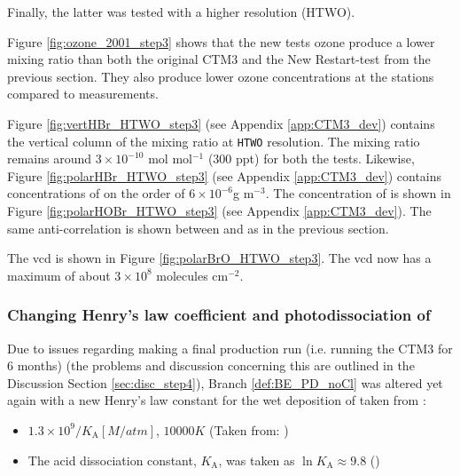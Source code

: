 Finally, the latter was tested with a higher resolution (HTWO). 

\medskip

Figure \ref{fig:ozone_2001_step3} shows that the new tests ozone produce a lower mixing ratio than both the original CTM3 and the New Restart-test from the previous section. They also produce lower ozone concentrations at the stations compared to measurements. 





\medskip

Figure \ref{fig:vertHBr_HTWO_step3} (see Appendix \ref{app:CTM3_dev}) contains the vertical column of the  mixing ratio at \texttt{HTWO} resolution. The mixing ratio remains around $3\times10^{-10}$ mol mol$^{-1}$ (300 ppt) for both the tests. Likewise, Figure \ref{fig:polarHBr_HTWO_step3} (see Appendix \ref{app:CTM3_dev}) contains concentrations of  on the order of $6\times10^{-6} $g m$^{-3}$. The concentration of  is shown in Figure \ref{fig:polarHOBr_HTWO_step3} (see Appendix \ref{app:CTM3_dev}). The same anti-correlation is shown between  and  as in the previous section. 

\medskip

The  \acrshort{vcd} is shown in Figure \ref{fig:polarBrO_HTWO_step3}. The  \acrshort{vcd} now has a maximum of about $3\times10^8$ molecules cm$^{-2}$. 

\subsubsection{Changing Henry's law coefficient and photodissociation of }\label{sec:res_step4}

Due to issues regarding making a final production run (i.e. running the CTM3 for 6 months) (the problems and discussion concerning this are outlined in the Discussion Section \ref{sec:disc_step4}), Branch \ref{def:BE_PD_noCl} was altered yet again with a new Henry's law constant for the wet deposition of  taken from \cite{Sander99}: 

\begin{itemize}
    \item $1.3\times10^9/K_\text{A} [M/atm]$, $10 000 K$ (Taken from: \cite{Brimblecombe1988TheSA})
    \item The acid dissociation constant, $K_\text{A}$, was taken as $\ln{K_\text{A}} \approx 9.8$ (\cite{Levanov})
\end{itemize}

